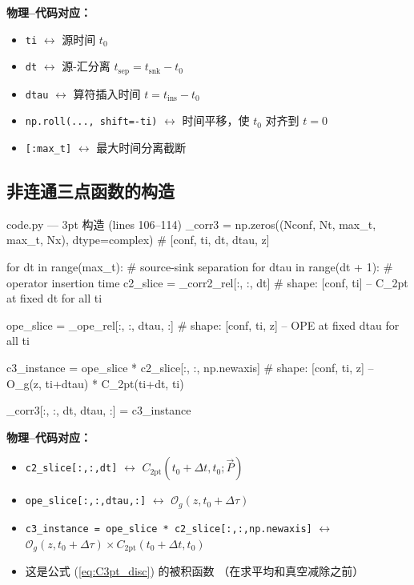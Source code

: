 \documentclass[12pt,a4paper]{ctexart}
\begin{document}
\textbf{物理--代码对应：}
\begin{itemize}
    \item \texttt{ti} $\longleftrightarrow$ 源时间 $t_0$
    \item \texttt{dt} $\longleftrightarrow$ 源-汇分离 $t_{\text{sep}} = t_{\text{snk}} - t_0$
    \item \texttt{dtau} $\longleftrightarrow$ 算符插入时间 $t = t_{\text{ins}} - t_0$
    \item \texttt{np.roll(..., shift=-ti)} $\longleftrightarrow$
        时间平移，使 $t_0$ 对齐到 $t=0$
    \item \texttt{[:max\_t]} $\longleftrightarrow$ 最大时间分离截断
\end{itemize}

\subsection{非连通三点函数的构造}

\begin{codeblock}{code.py --- 3pt 构造 (lines 106--114)}
_corr3 = np.zeros((Nconf, Nt, max_t, max_t, Nx), dtype=complex)
# [conf, ti, dt, dtau, z]

for dt in range(max_t):       # source-sink separation
    for dtau in range(dt + 1): # operator insertion time
        c2_slice = _corr2_rel[:, :, dt]
        # shape: [conf, ti]  -- C_2pt at fixed dt for all ti

        ope_slice = _ope_rel[:, :, dtau, :]
        # shape: [conf, ti, z]  -- OPE at fixed dtau for all ti

        c3_instance = ope_slice * c2_slice[:, :, np.newaxis]
        # shape: [conf, ti, z]  -- O_g(z, ti+dtau) * C_2pt(ti+dt, ti)

        _corr3[:, :, dt, dtau, :] = c3_instance
\end{codeblock}

\textbf{物理--代码对应：}
\begin{itemize}
    \item \texttt{c2\_slice[:,:,dt]} $\longleftrightarrow$
        $C_{\text{2pt}}(t_0 + \Delta t, t_0; \vec{P})$
    \item \texttt{ope\_slice[:,:,dtau,:]} $\longleftrightarrow$
        $\mathcal{O}_g(z, t_0 + \Delta\tau)$
    \item \texttt{c3\_instance = ope\_slice * c2\_slice[:,:,np.newaxis]} $\longleftrightarrow$
        $\mathcal{O}_g(z, t_0+\Delta\tau) \times C_{\text{2pt}}(t_0+\Delta t, t_0)$
    \item 这是公式 (\ref{eq:C3pt_disc}) 的被积函数
        （在求平均和真空减除之前）
\end{itemize}
\end{document}
